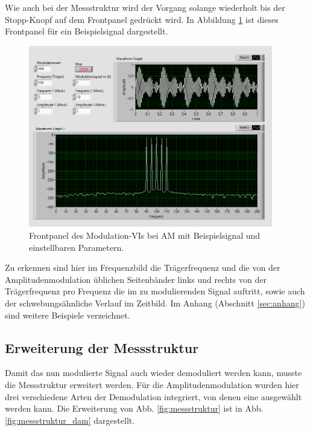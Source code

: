 		Wie auch bei der Messstruktur wird der Vorgang solange wiederholt bis der Stopp-Knopf auf dem Frontpanel gedrückt wird.  
		In Abbildung \ref{fig:am_example} ist dieses Frontpanel für ein Beispielsignal dargestellt.
		
		\begin{figure}[H]
			\centering
			\includegraphics[width=0.95\textwidth]{pic/am_example.png}
			\caption{Frontpanel des Modulation-VIs bei AM mit Beispielsignal und einstellbaren Parametern.}
			\label{fig:am_example}	
		\end{figure} 
		
		Zu erkennen sind hier im Frequenzbild die Trägerfrequenz und die von der Amplitudenmodulation üblichen Seitenbänder links und rechts von der Trägerfrequenz pro Frequenz die im zu modulierenden Signal auftritt, sowie auch der schwebungsähnliche Verlauf im Zeitbild.
		Im Anhang (Abschnitt \ref*{sec:anhang}) sind weitere Beispiele verzeichnet.
		
	\subsection{Erweiterung der Messstruktur}
		
		Damit das nun modulierte Signal auch wieder demoduliert werden kann, musste die Messstruktur erweitert werden.
		Für die Amplitudenmodulation wurden hier drei verschiedene Arten der Demodulation integriert, von denen eine ausgewählt werden kann.
		Die Erweiterung von Abb. \ref{fig:messstruktur} ist in Abb. \ref{fig:messstruktur_dam} dargestellt.
		
